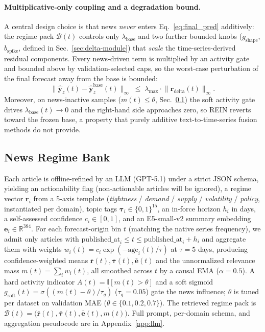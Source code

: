 \documentclass{article}
\newcommand{\method}{REIN\xspace}
\begin{document}
\paragraph{Multiplicative-only coupling and a degradation bound.}
A central design choice is that news \emph{never} enters Eq.~\ref{eq:final_pred} additively: the regime pack $\mathcal{B}(t)$ controls only $\lambda_{\text{base}}$ and two further bounded knobs ($g_{\text{shape}}$, $b_{\text{spike}}$, defined in Sec.~\ref{sec:delta-module}) that \emph{scale} the time-series-derived residual components.
Every news-driven term is multiplied by an activity gate and bounded above by validation-selected caps, so the worst-case perturbation of the final forecast away from the base is bounded:
\begin{equation}
    \bigl\|\hat{\bm{y}}_z(t) - \hat{\bm{y}}^{\text{base}}_z(t)\bigr\|_\infty \;\le\; \lambda_{\max}\cdot \bigl\|\bm{r}_{\text{delta}}(t)\bigr\|_\infty.
    \label{eq:bound}
\end{equation}
Moreover, on news-inactive samples ($m(t)\le\theta$, Sec.~\ref{sec:news-bank}) the soft activity gate drives $\lambda_{\text{base}}(t)\to 0$ and the right-hand side approaches zero, so \method reverts toward the frozen base, a property that purely additive text-to-time-series fusion methods do not provide.

\subsection{News Regime Bank}
\label{sec:news-bank}

Each article is offline-refined by an LLM (GPT-5.1) under a strict JSON schema, yielding an actionability flag (non-actionable articles will be ignored), a regime vector $\bm{r}_i$ from a 5-axis template (\emph{tightness} / \emph{demand} / \emph{supply} / \emph{volatility} / \emph{policy}, instantiated per domain), topic tags $\bm{\tau}_i\in\{0,1\}^{15}$, an in-force horizon $h_i$ in days, a self-assessed confidence $c_i\in[0,1]$, and an E5-small-v2 summary embedding $\bm{e}_i\in\mathbb{R}^{384}$.
For each forecast-origin bin $t$ (matching the native series frequency), we admit only articles with $\mathrm{published\_at}_i\le t \le \mathrm{published\_at}_i+h_i$ and aggregate them with weights $w_i(t)=c_i\exp(-\mathrm{age}_i(t)/\tau)$ at $\tau{=}5$ days, producing confidence-weighted means $\bar{\bm{r}}(t),\bar{\bm{\tau}}(t),\bar{\bm{e}}(t)$ and the unnormalized relevance mass $m(t)=\sum_i w_i(t)$, all smoothed across $t$ by a causal EMA ($\alpha{=}0.5$).
A hard activity indicator $A(t)=\mathbb{I}[m(t)>\theta]$ and a soft sigmoid $g_{\text{soft}}(t)=\sigma((m(t)-\theta)/\tau_g)$ ($\tau_g{=}0.05$) gate the news influence; $\theta$ is tuned per dataset on validation MAE ($\theta\in\{0.1,0.2,0.7\}$).
The retrieved regime pack is $\mathcal{B}(t)=\bigl(\bar{\bm{r}}(t),\bar{\bm{\tau}}(t),\bar{\bm{e}}(t),m(t)\bigr)$.
Full prompt, per-domain schema, and aggregation pseudocode are in Appendix~\ref{app:llm}.
\end{document}
